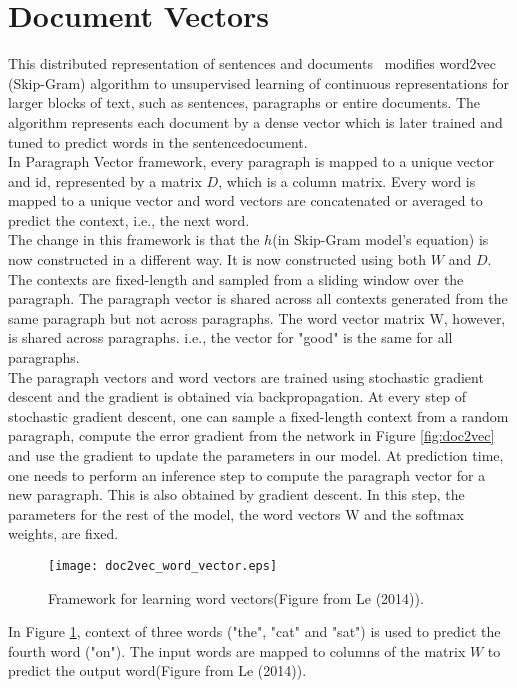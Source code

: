\section{Document Vectors}
This distributed representation of sentences and documents~\cite{Le:14} modifies word2vec (Skip-Gram) algorithm to unsupervised learning of continuous representations for larger blocks of text, such as sentences, paragraphs or entire documents. The algorithm represents each document by a dense vector which is later trained and tuned to predict words in the sentence\/document.\\
In Paragraph Vector framework, every paragraph is mapped to a unique vector and id, represented by a matrix $D$, which is a column matrix. Every word is mapped to a unique vector and word vectors are concatenated or averaged to predict the context, i.e., the next word.\\
The change in this framework is that the $h$(in Skip-Gram model's equation) is now constructed in a different way. It is now constructed using both $W$ and $D$.\\
The contexts are fixed-length and sampled from a sliding window over the paragraph. The paragraph vector is shared across all contexts generated from the same paragraph but not across paragraphs.  The word vector matrix W, however, is shared across paragraphs. i.e., the vector for "good" is the same for all paragraphs.\\

The paragraph vectors and word vectors are trained using stochastic gradient descent and the gradient is obtained via backpropagation.  At every step of stochastic gradient descent, one can sample a fixed-length context from a random paragraph, compute the error gradient from the network in Figure \ref{fig:doc2vec} and use the gradient to update the parameters in our model. At prediction time, one needs to perform an inference step to compute the paragraph vector for a new paragraph. This is also obtained by gradient descent.  In this step, the parameters for the rest of the model, the word vectors W
and the softmax weights, are fixed.

\begin{figure}[ht!]
\centering
\texttt{[image: doc2vec\_word\_vector.eps]}
\caption{Framework for learning word vectors(Figure from Le (2014)). \label{fig:word2vec}}
\end{figure}
In Figure \ref{fig:word2vec}, context  of three words ("the", "cat" and "sat") is used to predict the fourth word ("on"). The input words are mapped to columns of the matrix $W$ to predict the output word(Figure from Le (2014)).

